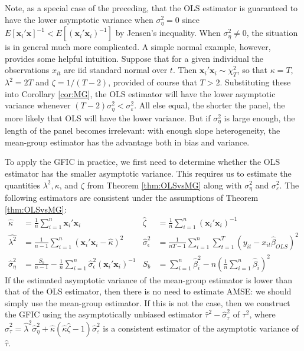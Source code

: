 Note, as a special case of the preceding, that the OLS estimator is guaranteed to have the lower asymptotic variance when $\sigma_{\eta}^2 = 0$ since $E[\mathbf{x}_i'\mathbf{x}]^{-1} < E[(\mathbf{x}_i'\mathbf{x}_i)^{-1}]$ by Jensen's inequality.
When $\sigma_{\eta}^2 \neq 0$, the situation is in general much more complicated.
A simple normal example, however, provides some helpful intuition.
Suppose that for a given individual the observations $x_{it}$ are iid standard normal over $t$.
Then $\mathbf{x}_i'\mathbf{x}_i \sim \chi^2_T$, so that $\kappa = T$, $\lambda^2 = 2T$ and $\zeta = 1 / (T-2)$, provided of course that $T>2$.
Substituting these into Corollary \ref{cor:MG}, the OLS estimator will have the lower asymptotic variance whenever $(T-2)\sigma^2_\eta < \sigma_{\varepsilon}^2$.
All else equal, the shorter the panel, the more likely that OLS will have the lower variance.
But if $\sigma_{\eta}^2$ is large enough, the length of the panel becomes irrelevant: with enough slope heterogeneity, the mean-group estimator has the advantage both in bias and variance.

To apply the GFIC in practice, we first need to determine whether the OLS estimator has the smaller asymptotic variance.
This requires us to estimate the quantities $\lambda^2, \kappa$, and $\zeta$ from Theorem \ref{thm:OLSvsMG} along with $\sigma_{\eta}^2$ and $\sigma_{\varepsilon}^2$.
The following estimators are consistent under the assumptions of Theorem \ref{thm:OLSvsMG}:
\begin{align*}
  \widehat{\kappa} &= \frac{1}{n}\sum_{i=1}^n \mathbf{x}_i'\mathbf{x}_i &
  \widehat{\zeta} &= \frac{1}{n}\sum_{i=1}^n (\mathbf{x}_i'\mathbf{x}_i)^{-1} \\
  \widehat{\lambda^2} &= \frac{1}{n-1}\sum_{i=1}^n (\mathbf{x}_i'\mathbf{x}_i - \widehat{\kappa})^2  &
\widehat{\sigma}_\epsilon^2 &= \frac{1}{nT - 1} \sum_{i=1}^n \sum_{t=1}^T (y_{it}-x_{it}\widehat{\beta}_{OLS})^2\\
\widehat{\sigma}_\eta^2 &= \frac{S_b}{n-1} -\frac{1}{n} \sum_{i=1}^n \widehat{\sigma}_\epsilon^2 (\mathbf{x}_i'\mathbf{x}_i)^{-1} & 
S_b &= \sum_{i=1}^n \widehat{\beta}_i^2 - n\left(\frac{1}{n} \sum_{i=1}^n \widehat{\beta}_i\right)^2 
\end{align*}
If the estimated asymptotic variance of the mean-group estimator is lower than that of the OLS estimator, then there is no need to estimate AMSE: we should simply use the mean-group estimator.
If this is not the case, then we construct the GFIC using the asymptotically unbiased estimator $\widehat{\tau}^2 - \widehat{\sigma}_\tau^2$ of $\tau^2$, where $\widehat{\sigma}_\tau^2 = \widehat{\lambda}^2 \widehat{\sigma}^2_{\eta} + \widehat{\kappa}(\widehat{\kappa}\widehat{\zeta} - 1) \widehat{\sigma}_{\varepsilon}^2$ is a consistent estimator of the asymptotic variance of $\widehat{\tau}$.
